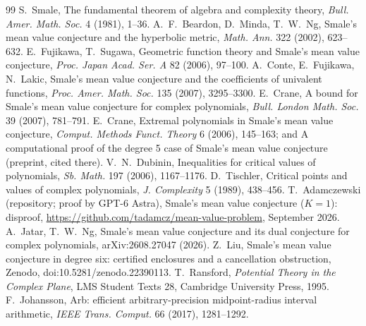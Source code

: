 \documentclass[11pt]{article}
\numberwithin{equation}{section}
\theoremstyle{definition}
\theoremstyle{remark}
\begin{document}
\begin{thebibliography}{99}
 S.~Smale, The fundamental theorem of algebra and complexity theory,
\emph{Bull. Amer. Math. Soc.} 4 (1981), 1--36.
 A.~F.~Beardon, D.~Minda, T.~W.~Ng, Smale's mean value conjecture and the hyperbolic
metric, \emph{Math. Ann.} 322 (2002), 623--632.
 E.~Fujikawa, T.~Sugawa, Geometric function theory and Smale's mean value conjecture,
\emph{Proc. Japan Acad. Ser. A} 82 (2006), 97--100.
 A.~Conte, E.~Fujikawa, N.~Lakic, Smale's mean value conjecture and the coefficients of
univalent functions, \emph{Proc. Amer. Math. Soc.} 135 (2007), 3295--3300.
 E.~Crane, A bound for Smale's mean value conjecture for complex polynomials,
\emph{Bull. London Math. Soc.} 39 (2007), 781--791.
 E.~Crane, Extremal polynomials in Smale's mean value conjecture, \emph{Comput. Methods
Funct. Theory} 6 (2006), 145--163; and A computational proof of the degree 5 case of Smale's mean value
conjecture (preprint, cited there).
 V.~N.~Dubinin, Inequalities for critical values of polynomials, \emph{Sb. Math.} 197
(2006), 1167--1176.
 D.~Tischler, Critical points and values of complex polynomials,
\emph{J. Complexity} 5 (1989), 438--456.
 T.~Adamczewski (repository; proof by GPT-6 Astra), Smale's mean value conjecture
($K=1$): disproof, \url{https://github.com/tadamcz/mean-value-problem}, September 2026.
 A.~Jatar, T.~W.~Ng, Smale's mean value conjecture and its dual conjecture for
complex polynomials, arXiv:2608.27047 (2026).
 Z.~Liu, Smale's mean value conjecture in degree six: certified enclosures and a
cancellation obstruction, Zenodo, doi:10.5281/zenodo.22390113.
 T.~Ransford, \emph{Potential Theory in the Complex Plane}, LMS Student Texts 28,
Cambridge University Press, 1995.
 F.~Johansson, Arb: efficient arbitrary-precision midpoint-radius interval arithmetic,
\emph{IEEE Trans. Comput.} 66 (2017), 1281--1292.
\end{thebibliography}
\end{document}
